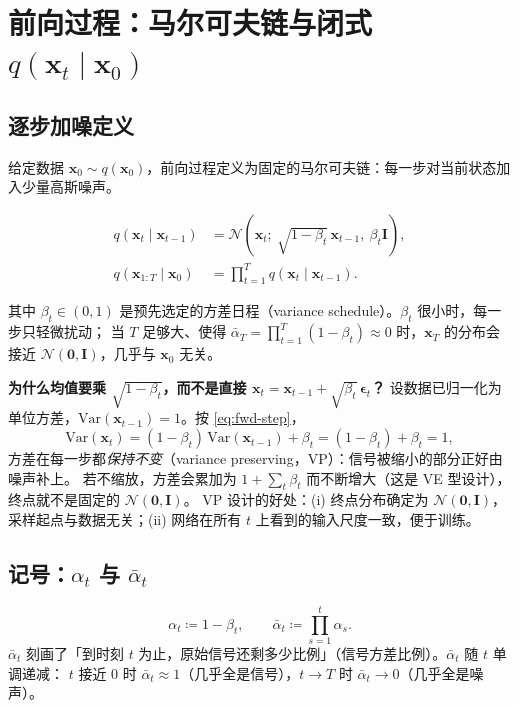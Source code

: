 \documentclass[a4paper,fontset=none,zihao=5]{ctexart}
\numberwithin{equation}{section}
\newcommand{\x}{\mathbf{x}}
\newcommand{\I}{\mathbf{I}}
\newcommand{\N}{\mathcal{N}}
\newcommand{\abar}{\bar{\alpha}}
\newcommand{\eps}{\boldsymbol{\epsilon}}
\begin{document}
\newpage
\section{前向过程：马尔可夫链与闭式 \texorpdfstring{$q(\x_t\mid\x_0)$}{q(x\_t|x\_0)}}

\subsection{逐步加噪定义}
给定数据 $\x_0\sim q(\x_0)$，前向过程定义为固定的马尔可夫链：每一步对当前状态加入少量高斯噪声。
\begin{keybox}
\begin{align}
  q(\x_t\mid\x_{t-1}) &= \N\!\left(\x_t;\ \sqrt{1-\beta_t}\,\x_{t-1},\ \beta_t\I\right), \label{eq:fwd-step}\\
  q(\x_{1:T}\mid\x_0) &= \prod_{t=1}^{T} q(\x_t\mid\x_{t-1}). \label{eq:fwd-joint}
\end{align}
\end{keybox}
其中 $\beta_t\in(0,1)$ 是预先选定的方差日程（variance schedule）。$\beta_t$ 很小时，每一步只轻微扰动；
当 $T$ 足够大、使得 $\abar_T=\prod_{t=1}^T(1-\beta_t)\approx 0$ 时，$\x_T$ 的分布会接近 $\N(\mathbf{0},\I)$，几乎与 $\x_0$ 无关。

\begin{whybox}
\textbf{为什么均值要乘 $\sqrt{1-\beta_t}$，而不是直接 $\x_t=\x_{t-1}+\sqrt{\beta_t}\,\eps_t$？}
设数据已归一化为单位方差，$\mathrm{Var}(\x_{t-1})=1$。按 \eqref{eq:fwd-step}，
\[
  \mathrm{Var}(\x_t)=(1-\beta_t)\,\mathrm{Var}(\x_{t-1})+\beta_t=(1-\beta_t)+\beta_t=1,
\]
方差在每一步都\emph{保持不变}（variance preserving，VP）：信号被缩小的部分正好由噪声补上。
若不缩放，方差会累加为 $1+\sum_t\beta_t$ 而不断增大（这是 VE 型设计），终点就不是固定的 $\N(\mathbf{0},\I)$。
VP 设计的好处：(i) 终点分布确定为 $\N(\mathbf{0},\I)$，采样起点与数据无关；(ii) 网络在所有 $t$ 上看到的输入尺度一致，便于训练。
\end{whybox}

\subsection{记号：\texorpdfstring{$\alpha_t$ 与 $\abar_t$}{alpha\_t 与 alpha-bar\_t}}
\begin{equation}
  \alpha_t \coloneqq 1-\beta_t, \qquad \abar_t \coloneqq \prod_{s=1}^{t}\alpha_s .
  \label{eq:alphabar}
\end{equation}
$\abar_t$ 刻画了「到时刻 $t$ 为止，原始信号还剩多少比例」（信号方差比例）。$\abar_t$ 随 $t$ 单调递减：
$t$ 接近 $0$ 时 $\abar_t\approx 1$（几乎全是信号），$t\to T$ 时 $\abar_t\to 0$（几乎全是噪声）。
\end{document}
